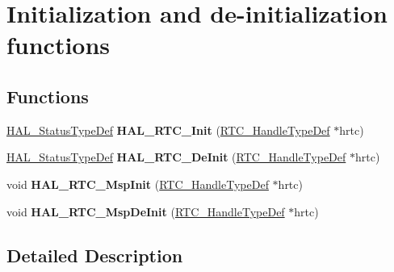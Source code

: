 \hypertarget{group___r_t_c___exported___functions___group1}{}\section{Initialization and de-\/initialization functions}
\label{group___r_t_c___exported___functions___group1}
\subsection*{Functions}
\begin{DoxyCompactItemize}
\item 
\mbox{\label{group___r_t_c___exported___functions___group1_gaa6b53830aa3e2efaf210c0b1d3e5f4a4}} 
\hyperlink{stm32f0xx__hal__def_8h_a63c0679d1cb8b8c684fbb0632743478f}{H\+A\+L\+\_\+\+Status\+Type\+Def} {\bfseries H\+A\+L\+\_\+\+R\+T\+C\+\_\+\+Init} (\hyperlink{struct_r_t_c___handle_type_def}{R\+T\+C\+\_\+\+Handle\+Type\+Def} $\ast$hrtc)
\item 
\mbox{\label{group___r_t_c___exported___functions___group1_ga24a8aac7bd6d9bac9f211d24ff6930ec}} 
\hyperlink{stm32f0xx__hal__def_8h_a63c0679d1cb8b8c684fbb0632743478f}{H\+A\+L\+\_\+\+Status\+Type\+Def} {\bfseries H\+A\+L\+\_\+\+R\+T\+C\+\_\+\+De\+Init} (\hyperlink{struct_r_t_c___handle_type_def}{R\+T\+C\+\_\+\+Handle\+Type\+Def} $\ast$hrtc)
\item 
\mbox{\label{group___r_t_c___exported___functions___group1_gaee6eddaa309c8c9829f1ca794d8f99c5}} 
void {\bfseries H\+A\+L\+\_\+\+R\+T\+C\+\_\+\+Msp\+Init} (\hyperlink{struct_r_t_c___handle_type_def}{R\+T\+C\+\_\+\+Handle\+Type\+Def} $\ast$hrtc)
\item 
\mbox{\label{group___r_t_c___exported___functions___group1_ga8767bc3a4d472d39a688090ab10ba6ce}} 
void {\bfseries H\+A\+L\+\_\+\+R\+T\+C\+\_\+\+Msp\+De\+Init} (\hyperlink{struct_r_t_c___handle_type_def}{R\+T\+C\+\_\+\+Handle\+Type\+Def} $\ast$hrtc)
\end{DoxyCompactItemize}


\subsection{Detailed Description}
